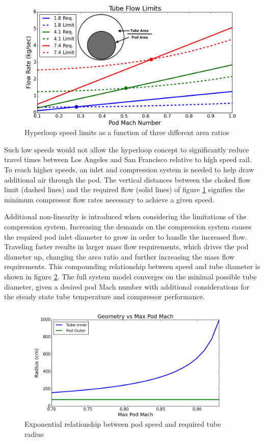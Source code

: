 \documentclass[heading.tex]{subfiles}
\begin{document}
\begin{figure}[hbtp]
\centering
\includegraphics[width=\textwidth]{images/tube_flow_limit3.png}
\caption{Hyperloop speed limits as a function of three different area ratios}
\label{f:flowLIMIT}
\end{figure}

Such low speeds would not allow the hyperloop concept to significantly reduce travel times between Los Angeles and San Francisco relative to high speed rail.
To reach higher speeds, an inlet and compression system is needed to help draw additional air through the pod. The vertical distances between the choked flow
limit (dashed lines) and the required flow (solid lines) of figure \ref{f:flowLIMIT} signifies the minimum compressor flow rates necessary to achieve a given speed. 

Additional non-linearity is introduced when considering the limitations of the compression system. Increasing the demands on the compression system
causes the required pod inlet diameter to grow in order to handle the increased flow. Traveling faster results in larger mass flow requirements, which drives
the pod diameter up, changing the area ratio and further increasing the mass flow requirements. This compounding relationship between 
speed and tube diameter is shown in figure \ref{f:machRAD}. The full system model converges on the minimal possible tube diameter, given a desired
pod Mach number with additional considerations for the steady state tube temperature and compressor performance.

\begin{figure}[hbtp]
\centering
\includegraphics[width=\textwidth]{images/mach_vs_rad2.png}
\caption{Exponential relationship between pod speed and required tube radius}
\label{f:machRAD}
\end{figure}
\end{document}
